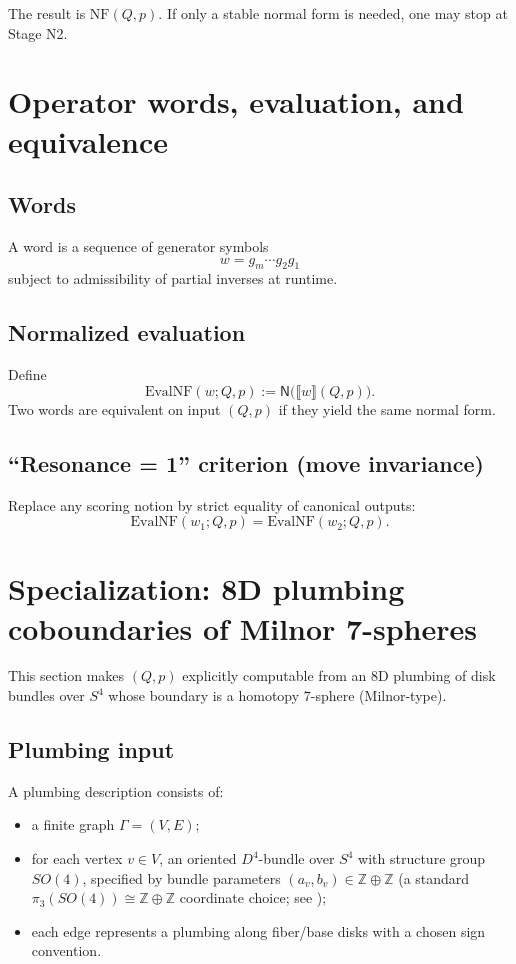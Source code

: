 \documentclass[11pt]{article}
\newcommand{\ZZ}{\mathbb{Z}}
\newcommand{\NF}{\mathrm{NF}}
\newcommand{\bracks}[1]{\llbracket #1 \rrbracket}
\begin{document}
The result is $\NF(Q,p)$. If only a stable normal form is needed, one may stop at Stage N2.

\section{Operator words, evaluation, and equivalence}

\subsection{Words}
A word is a sequence of generator symbols
\[
w=g_m\cdots g_2 g_1
\]
subject to admissibility of partial inverses at runtime.

\subsection{Normalized evaluation}
Define
\[
\mathrm{EvalNF}(w;Q,p) := \mathsf{N}\big(\bracks{w}(Q,p)\big).
\]
Two words are equivalent on input $(Q,p)$ if they yield the same normal form.

\subsection{``Resonance = 1'' criterion (move invariance)}
Replace any scoring notion by strict equality of canonical outputs:
\[
\mathrm{EvalNF}(w_1;Q,p) = \mathrm{EvalNF}(w_2;Q,p).
\]

\section{Specialization: 8D plumbing coboundaries of Milnor 7-spheres}\label{sec:plumbing}

This section makes $(Q,p)$ explicitly computable from an 8D plumbing of disk bundles over $S^4$ whose boundary is a homotopy 7-sphere (Milnor-type).

\subsection{Plumbing input}
A plumbing description consists of:
\begin{itemize}
\item a finite graph $\Gamma=(V,E)$;
\item for each vertex $v\in V$, an oriented $D^4$-bundle over $S^4$ with structure group $SO(4)$, specified by bundle parameters $(a_v,b_v)\in \ZZ\oplus \ZZ$ (a standard $\pi_3(SO(4))\cong \ZZ\oplus\ZZ$ coordinate choice; see \cite{DW59,CE03});
\item each edge represents a plumbing along fiber/base disks with a chosen sign convention.
\end{itemize}
\end{document}
